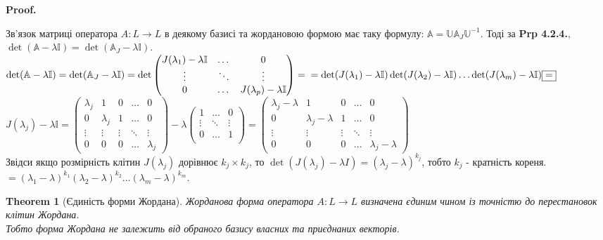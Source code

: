 \documentclass[a4paper, 10pt]{article}
\makeatletter
\def\qed{$\blacksquare$}
\theoremstyle{theoremdd}
\newtheorem{theorem}{Theorem}[subsection]
\theoremstyle{theoremdd}
\theoremstyle{theoremdd}
\theoremstyle{theoremdd}
\theoremstyle{theoremdd}
\theoremstyle{theoremdd}
\theoremstyle{theoremdd}
\theoremstyle{theoremdd}
\renewenvironment{proof}[1][Proof.\\]{\par
\pushQED{\hfill \qed}%
\normalfont \topsep6\p@\@plus6\p@\relax
\trivlist
\item\relax
{\bfseries
#1\@addpunct{.}}\hspace\labelsep\ignorespaces
}{%
\popQED\endtrivlist\@endpefalse
}
\makeatother
\begin{document}
\begin{proof}
Зв'язок матриці оператора $A: L \to L$ в деякому базисі та жордановою формою має таку формулу: $\mathbb{A} = \mathbb{U} \mathbb{A}_J \mathbb{U}^{-1}$. Тоді за \textbf{Prp 4.2.4.}, $\det (\mathbb{A}-\lambda \mathbb{I}) = \det (\mathbb{A}_J -\lambda \mathbb{I})$.\\
$\det (\mathbb{A} - \lambda \mathbb{I}) = \det (\mathbb{A}_{J} - \lambda \mathbb{I}) = \det \begin{pmatrix}
J(\lambda_1) - \lambda \mathbb{I} & \dots & 0 \\
\vdots & \ddots & \vdots \\
0 & \dots & J(\lambda_p) - \lambda \mathbb{I}
\end{pmatrix} = \\ = \det(J(\lambda_1)-\lambda \mathbb{I}) \det(J(\lambda_2)-\lambda \mathbb{I}) \dots \det(J(\lambda_m)-\lambda \mathbb{I}) \boxed{=} \\
$
$J(\lambda_j)-\lambda \mathbb{I} = \begin{pmatrix}
\lambda_j & 1 & 0 & \dots & 0 \\
0 & \lambda_j & 1 & \dots & 0 \\
\vdots & \vdots & \vdots & \ddots & \vdots \\
0 & 0 & 0 & \dots & \lambda_j
\end{pmatrix} - \lambda \begin{pmatrix}
1 & \dots & 0 \\
\vdots & \ddots & \vdots \\
0 & \dots & 1 \\
\end{pmatrix} = \begin{pmatrix}
\lambda_j - \lambda & 1 & 0 & \dots & 0 \\
0 & \lambda_j - \lambda & 1 & \dots & 0 \\
\vdots & \vdots & \vdots & \ddots & \vdots \\
0 & 0 & 0 & \dots & \lambda_j - \lambda
\end{pmatrix}$\\
Звідси якщо розмірність клітин $J(\lambda_j)$ дорівнює $k_j \times k_j$, то $\det (J(\lambda_j) - \lambda I) = (\lambda_j - \lambda)^{k_j}$, тобто $k_j$ - кратність кореня.\\
$\boxed{=} (\lambda_1-\lambda)^{k_1}(\lambda_2-\lambda)^{k_2} \dots (\lambda_m-\lambda)^{k_m}$.
\end{proof}

\begin{theorem}[Єдиність форми Жордана]
Жорданова форма оператора $A: L \to L$ визначена єдиним чином із точністю до перестановок клітин Жордана.\\
Тобто форма Жордана не залежить від обраного базису власних та приєднаних векторів.
\end{theorem}
\end{document}
